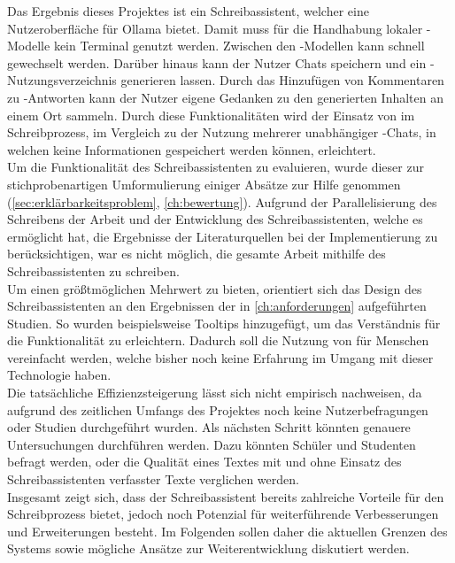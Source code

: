 \documentclass[../main.tex]{subfiles}
\begin{document}
Das Ergebnis dieses Projektes ist ein Schreibassistent, welcher eine Nutzeroberfläche für Ollama bietet. Damit muss für die Handhabung lokaler -Modelle kein Terminal genutzt werden. 
Zwischen den -Modellen kann schnell gewechselt werden. Darüber hinaus kann der Nutzer Chats speichern und ein -Nutzungsverzeichnis generieren lassen. Durch das Hinzufügen von Kommentaren 
zu -Antworten kann der Nutzer eigene Gedanken zu den generierten Inhalten an einem Ort sammeln. Durch diese Funktionalitäten wird der Einsatz von  im Schreibprozess, im Vergleich 
zu der Nutzung mehrerer unabhängiger -Chats, in welchen keine Informationen gespeichert werden können, erleichtert.\\ 
Um die Funktionalität des Schreibassistenten zu evaluieren, wurde dieser zur stichprobenartigen Umformulierung einiger Absätze zur Hilfe genommen (\autoref{sec:erklärbarkeitsproblem}, \autoref{ch:bewertung}). Aufgrund der Parallelisierung des Schreibens der Arbeit und der Entwicklung des Schreibassistenten, welche es ermöglicht hat, die Ergebnisse der Literaturquellen bei der 
Implementierung zu berücksichtigen, war es nicht möglich, die gesamte Arbeit mithilfe des Schreibassistenten zu schreiben. \\
Um einen größtmöglichen Mehrwert zu bieten, orientiert sich das Design des Schreibassistenten an den Ergebnissen der in \autoref{ch:anforderungen} aufgeführten Studien. So wurden beispielsweise 
Tooltips hinzugefügt, um das Verständnis für die Funktionalität zu erleichtern. Dadurch soll die Nutzung von  für Menschen vereinfacht werden, welche bisher noch keine Erfahrung im 
Umgang mit dieser Technologie haben.\\
Die tatsächliche Effizienzsteigerung lässt sich nicht empirisch nachweisen, da aufgrund des zeitlichen Umfangs des Projektes noch keine Nutzerbefragungen oder Studien durchgeführt 
wurden. Als nächsten Schritt könnten genauere Untersuchungen durchführen werden. Dazu könnten Schüler und Studenten befragt werden, oder die Qualität eines Textes mit und ohne 
Einsatz des Schreibassistenten verfasster Texte verglichen werden.\\ 
Insgesamt zeigt sich, dass der Schreibassistent bereits zahlreiche Vorteile für den Schreibprozess bietet, jedoch noch Potenzial für weiterführende Verbesserungen und Erweiterungen 
besteht. Im Folgenden sollen daher die aktuellen Grenzen des Systems sowie mögliche Ansätze zur Weiterentwicklung diskutiert werden.\\
\end{document}

